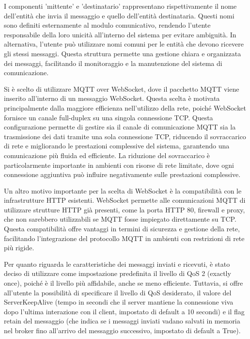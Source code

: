 \documentclass[12pt,a4paper,openright,twoside]{book}
\begin{document}
I componenti 'mittente' e 'destinatario' rappresentano rispettivamente il nome dell'entità che invia il messaggio e quello dell'entità destinataria. 
Questi nomi sono definiti esternamente al modulo comunicativo, rendendo l'utente responsabile della loro unicità all'interno del sistema per evitare ambiguità. 
In alternativa, l'utente può utilizzare nomi comuni per le entità che devono ricevere gli stessi messaggi. Questa struttura permette una gestione chiara e organizzata dei messaggi, 
facilitando il monitoraggio e la manutenzione del sistema di comunicazione.

Si è scelto di utilizzare \ac{MQTT} over WebSocket, dove il pacchetto \ac{MQTT} viene inserito all'interno di un messaggio WebSocket. Questa scelta è motivata principalmente dalla 
maggiore efficienza nell'utilizzo della rete, poiché WebSocket fornisce un canale full-duplex su una singola connessione \ac{TCP}. Questa configurazione permette di gestire sia il 
canale di comunicazione \ac{MQTT} sia la trasmissione dei dati tramite una sola connessione \ac{TCP}, riducendo il sovraccarico di rete e migliorando le prestazioni complessive del sistema, 
garantendo una comunicazione più fluida ed efficiente. La riduzione del sovraccarico è particolarmente importante in ambienti con risorse di rete limitate, 
dove ogni connessione aggiuntiva può influire negativamente sulle prestazioni complessive.

Un altro motivo importante per la scelta di WebSocket è la compatibilità con le infrastrutture HTTP esistenti. WebSocket permette alle comunicazioni \ac{MQTT} di utilizzare strutture HTTP già presenti, 
come la porta HTTP 80, firewall e proxy, che non sarebbero utilizzabili se \ac{MQTT} fosse impiegato direttamente su \ac{TCP}. Questa compatibilità offre vantaggi in termini di sicurezza e gestione della rete, 
facilitando l'integrazione del protocollo \ac{MQTT} in ambienti con restrizioni di rete più rigide.

Per quanto riguarda le caratteristiche dei messaggi inviati e ricevuti, è stato deciso di utilizzare come impostazione predefinita il livello di \ac{QoS} 2 (exactly once), poiché è il livello più affidabile, 
anche se meno efficiente. Tuttavia, si offre all'utente la possibilità di specificare il livello di \ac{QoS} desiderato, 
il valore del ServerKeepAlive (tempo in secondi che il server mantiene la connessione viva dopo l'ultima interazione con il client, impostato di default a 10 secondi) 
e il flag retain del messaggio (che indica se i messaggi inviati vadano salvati in memoria nel broker fino all'arrivo del messaggio successivo, impostato di default a True). 
\end{document}

